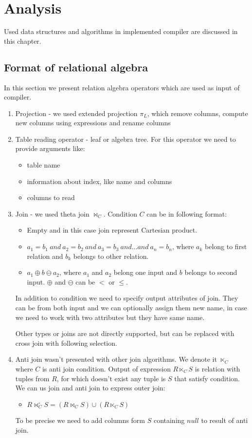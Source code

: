 \chapter{Analysis}
Used data structures and algorithms in implemented compiler are discussed in this chapter.
\section{Format of relational algebra}

In this section we present relation algebra operators which are used as input of compiler.
\begin{enumerate}
\item Projection - we used extended projection $\pi_L$, which remove columns, compute new columns using expressions and rename columns

\item Table reading operator - leaf or algebra tree. For this operator we need to provide arguments like:
\begin{itemize}
\item table name
\item information about index, like name and columns
\item columns to read
\end{itemize}
\item Join - we used theta join $\Join_C$. Condition $C$ can be in following format:
\begin{itemize}
\item Empty and in this case join represent Cartesian product.
\item $a_1=b_1~and~a_2=b_2~and~a_3=b_3~and...and~a_n=b_n$, where $a_k$ belong to first relation and $b_k$ belongs to other relation.
\item $a_1\oplus b \ominus a_2$, where $a_1$ and $a_2$ belong one input and $b$ belongs to second input. $\oplus$ and $\ominus$ can be $<$ or $\leq$.

\end{itemize}

In addition to condition we need to specify output attributes of join. They can be from both input and we can optionally assign them new name, in case we need to work with two attributes but they have same name.

Other types or joins are not directly supported, but can be replaced with cross join with following selection.
\item Anti join wasn't presented with other join algorithms. We denote it $\ltimes_C$ where $C$ is anti join condition. Output of expression $R \ltimes_C S$ is relation with tuples from $R$, for which doesn't exist any tuple is $S$ that satisfy condition. We can us join and anti join to express outer join:
\begin{itemize}
\item 
 $R\Join^\circ_C S= (R\Join_C S)\cup (R\ltimes_C S)$
\end{itemize}
To be precise we need to add columns form $S$ containing $null$ to result of anti join.
 

\end{enumerate}
